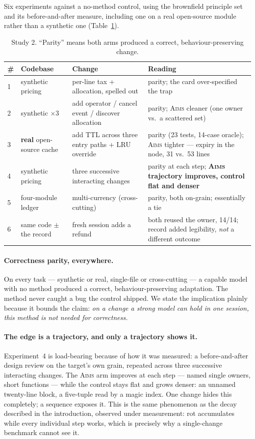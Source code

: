 \documentclass[11pt]{article}
\newcommand{\aims}{\textsc{Aims}}
\newcommand{\best}[1]{\textbf{#1}}
\begin{document}
Six experiments against a no-method control, using the brownfield principle set and its before-and-after measure, including one on a real open-source module rather than a synthetic one (Table~\ref{tab:study2}).

\begin{table}[h]
\centering\small
\caption{Study 2. ``Parity'' means both arms produced a correct, behaviour-preserving change.}
\label{tab:study2}
\begin{tabular}{llp{4.3cm}p{4.6cm}}
\toprule
\# & Codebase & Change & Reading \\
\midrule
1 & synthetic pricing & per-line tax + allocation, spelled out & parity; the card over-specified the trap \\
2 & synthetic $\times$3 & add operator / cancel event / discover allocation & parity; \aims{} cleaner (one owner vs.\ a scattered set) \\
3 & \textbf{real} open-source cache & add TTL across three entry paths + LRU override & parity (23 tests, 14-case oracle); \aims{} tighter --- expiry in the node, 31 vs.\ 53 lines \\
4 & synthetic pricing & three successive interacting changes & parity at each step; \best{\aims{} trajectory improves, control flat and denser} \\
5 & four-module ledger & multi-currency (cross-cutting) & parity, both on-grain; essentially a tie \\
6 & same code $\pm$ the record & fresh session adds a refund & both reused the owner, 14/14; record added legibility, \emph{not} a different outcome \\
\bottomrule
\end{tabular}
\end{table}

\paragraph{Correctness parity, everywhere.} On every task --- synthetic or real, single-file or cross-cutting --- a capable model with no method produced a correct, behaviour-preserving adaptation. The method never caught a bug the control shipped. We state the implication plainly because it bounds the claim: \emph{on a change a strong model can hold in one session, this method is not needed for correctness.}

\paragraph{The edge is a trajectory, and only a trajectory shows it.} Experiment~4 is load-bearing because of how it was measured: a before-and-after design review on the target's own grain, repeated across three successive interacting changes. The \aims{} arm improves at each step --- named single owners, short functions --- while the control stays flat and grows denser: an unnamed twenty-line block, a five-tuple read by a magic index. One change hides this completely; a sequence exposes it. This is the same phenomenon as the decay described in the introduction, observed under measurement: rot accumulates while every individual step works, which is precisely why a single-change benchmark cannot see it.
\end{document}
